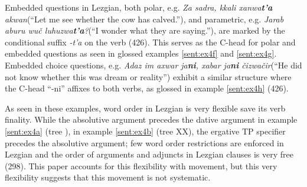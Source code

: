 Embedded questions in Lezgian, both polar, e.g. \textit{Za sadra, kkali xanwa\textbf{t'a} akwan}(``Let me see whether the cow has calved.''), and parametric, e.g. \textit{Jarab aburu wu\v{c} luhuzwa\textbf{t'a}?}(``I wonder what they are saying.''), are marked by the conditional suffix \textit{-t'a} on the verb (426). This serves as the C-head for polar and embedded questions as seen in glossed examples \ref{sent:ex4f} and \ref{sent:ex4g}. Embedded choice questions, e.g. \textit{Adaz im axwar ja\textbf{ni}, xabar ja\textbf{ni} \v{c}izwa\v{c}ir}(``He did not know whether this was dream or reality'') exhibit a similar structure where the C-head ``-ni'' affixes to both verbs, as glossed in example \ref{sent:ex4h} (426).

As seen in these examples, word order in Lezgian is very flexible save its verb finality. While the absolutive argument precedes the dative argument in example \ref{sent:ex4a} (tree ), in example \ref{sent:ex4b} (tree XX), the ergative TP specifier precedes the absolutive argument; few word order restrictions are enforced in Lezgian and the order of arguments and adjuncts in Lezgian clauses is very free (298). This paper accounts for this flexibility with movement, but this very flexibility suggests that this movement is not systematic. 